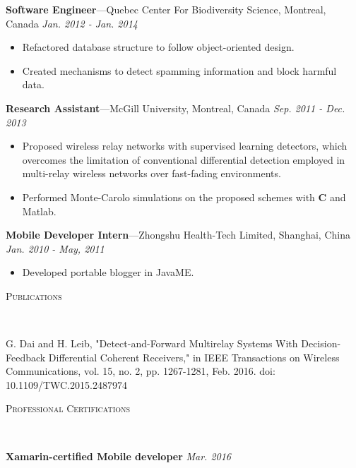 \documentclass[11pt]{article}
\newenvironment{changemargin}[2]{%
  \begin{list}{}{%
    \setlength{\topsep}{0pt}%
    \setlength{\leftmargin}{#1}%
    \setlength{\rightmargin}{#2}%
    \setlength{\listparindent}{\parindent}%
    \setlength{\itemindent}{\parindent}%
    \setlength{\parsep}{\parskip}%
  }%
  \item[]}{\end{list}
}
\newcommand{\lineover}{
	\begin{changemargin}{-0.05in}{-0.05in}
		\vspace*{-8pt}
		\hrulefill \\
		\vspace*{-2pt}
	\end{changemargin}
}
\newcommand{\header}[1]{
	\begin{changemargin}{-0.5in}{-0.5in}
		\scshape{#1}\\
  	\lineover
	\end{changemargin}
}
\newenvironment{body} {
	\vspace*{-16pt}
	\begin{changemargin}{-0.25in}{-0.5in}
  }	
	{\end{changemargin}
}
\begin{document}
\begin{body}
	\textbf{Software Engineer}---Quebec Center For Biodiversity Science, Montreal, Canada  \hfill \emph{Jan. 2012 - Jan. 2014}\\
	\begin{itemize} \itemsep -0pt  %
		\item Refactored database structure to follow object-oriented design.
		\item Created mechanisms to detect spamming information and block harmful data.
	\end{itemize}	
	
	\textbf{Research Assistant}---McGill University, Montreal, Canada  \hfill \emph{Sep. 2011 - Dec. 2013}\\
	\vspace*{-4pt}
	\begin{itemize} \itemsep -0pt  %
\item Proposed wireless relay networks with supervised learning detectors, which overcomes the limitation of conventional differential detection employed in multi-relay wireless networks over fast-fading environments. 
\item Performed Monte-Carolo simulations on the proposed schemes with \textbf{C} and Matlab.
	\end{itemize}

	\textbf{Mobile Developer Intern}---Zhongshu Health-Tech Limited, Shanghai, China \hfill \emph{Jan. 2010 - May, 2011}\\
	\begin{itemize} \itemsep -0pt  %
		\item Developed portable blogger in JavaME.
	\end{itemize}
\end{body}
\smallskip

\header{Publications}
\begin{body}
	\vspace{14pt}
	G. Dai and H. Leib, "Detect-and-Forward Multirelay Systems With Decision-Feedback Differential Coherent Receivers," in IEEE Transactions on Wireless Communications, vol. 15, no. 2, pp. 1267-1281, Feb. 2016.
doi: 10.1109/TWC.2015.2487974
\end{body}
\smallskip

\header{Professional Certifications}
\begin{body}
	\vspace{14pt}
	\textbf{Xamarin-certified Mobile developer} \hfill \emph{Mar. 2016}\\
\end{body}
\smallskip
\end{document}
